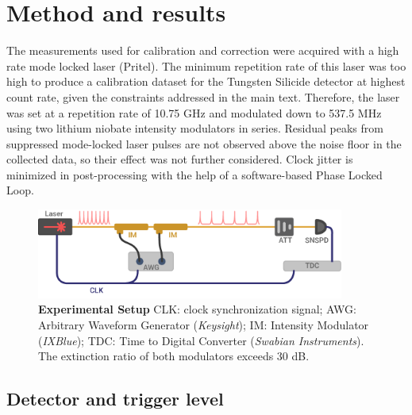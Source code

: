 \documentclass[11pt]{caltech_thesis} %
\begin{document}
\hypertarget{method-and-results}{%
\section{Method and results}\label{method-and-results}}

The measurements used for calibration and correction were acquired with a high rate mode locked laser (Pritel). The minimum repetition rate of this laser was too high to produce a calibration dataset for the Tungsten Silicide detector at highest count rate, given the constraints addressed in the main text. Therefore, the laser was set at a repetition rate of 10.75 GHz and modulated down to 537.5 MHz using two lithium niobate intensity modulators in series. Residual peaks from suppressed mode-locked laser pulses are not observed above the noise floor in the collected data, so their effect was not further considered. Clock jitter is minimized in post-processing with the help of a software-based Phase Locked Loop.

\hypertarget{fig:jitterate_exp_setup}{%
\begin{figure}
\centering
\includegraphics[width=0.9\textwidth,height=\textheight]{./chapter_03/figs/supplemental_expirement_light.pdf}
\caption[{Time walk experiment setup}]{\textbf{Experimental Setup} CLK: clock synchronization signal; AWG: Arbitrary Waveform Generator (\emph{Keysight}); IM: Intensity Modulator (\emph{IXBlue}); TDC: Time to Digital Converter (\emph{Swabian Instruments}). The extinction ratio of both modulators exceeds 30 dB.}
\label{fig:jitterate_exp_setup}
\end{figure}
}

\hypertarget{detector-and-trigger-level}{%
\subsection{Detector and trigger level}\label{detector-and-trigger-level}}
\end{document}
